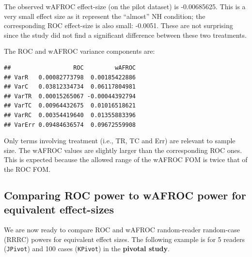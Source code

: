 \documentclass[
]{book}
\begin{document}
The observed wAFROC effect-size (on the pilot dataset) is -0.00685625. This is a very small effect size as it represent the ``almost'' NH condition; the corresponding ROC effect-size is also small: -0.0051. These are not surprising since the study did not find a significant difference between these two treatments.

The ROC and wAFROC variance components are:

\begin{verbatim}
##                  ROC         wAFROC
## VarR   0.00082773798  0.00185422886
## VarC   0.03812334734  0.06117804981
## VarTR  0.00015265067 -0.00044392794
## VarTC  0.00964432675  0.01016518621
## VarRC  0.00354419640  0.01355883396
## VarErr 0.09484636574  0.09672559908
\end{verbatim}

Only terms involving treatment (i.e., TR, TC and Err) are relevant to sample size. The wAFROC values are slightly larger than the corresponding ROC ones. This is expected because the allowed range of the wAFROC FOM is twice that of the ROC FOM.

\hypertarget{comparing-roc-power-to-wafroc-power-for-equivalent-effect-sizes}{%
\subsection{Comparing ROC power to wAFROC power for equivalent effect-sizes}\label{comparing-roc-power-to-wafroc-power-for-equivalent-effect-sizes}}

We are now ready to compare ROC and wAFROC random-reader random-case (RRRC) powers for equivalent effect sizes. The following example is for 5 readers (\texttt{JPivot}) and 100 cases (\texttt{KPivot}) in the \textbf{pivotal study}.
\end{document}
